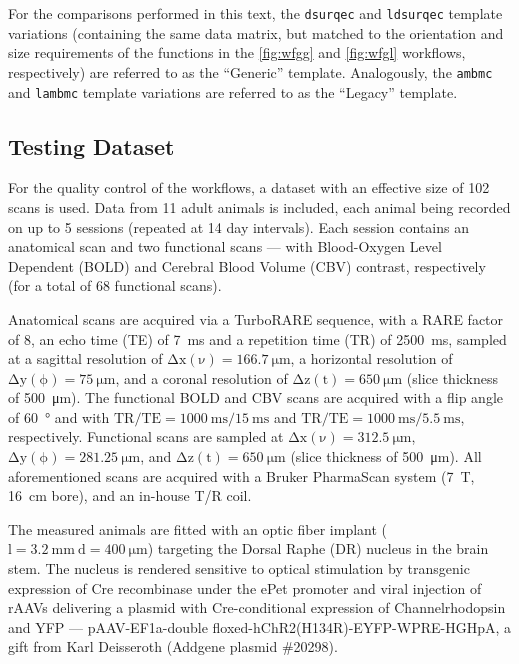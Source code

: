 For the comparisons performed in this text, the \textcolor{mg}{\texttt{dsurqec}} and \textcolor{mg}{\texttt{ldsurqec}} template variations (containing the same data matrix, but matched to the orientation and size requirements of the functions in the \cref{fig:wfgg} and \cref{fig:wfgl} workflows, respectively) are referred to as the “Generic” template.
Analogously, the \textcolor{mg}{\texttt{ambmc}} and \textcolor{mg}{\texttt{lambmc}} template variations are referred to as the “Legacy” template.

\subsection{Testing Dataset}

For the quality control of the workflows, a dataset with an effective size of 102 scans is used.
Data from 11 adult animals is included, each animal being recorded on up to 5 sessions (repeated at 14 day intervals).
Each session contains an anatomical scan and two functional scans --- with Blood-Oxygen Level Dependent (BOLD) \cite{Ogawa1990} and Cerebral Blood Volume (CBV) \cite{Marota1999} contrast, respectively (for a total of 68 functional scans).

Anatomical scans are acquired via a TurboRARE sequence, with a RARE factor of 8, an echo time (TE) of \SI{7}{\milli\second} and a repetition time (TR) of \SI{2500}{\milli\second}, sampled at a sagittal resolution of $\mathrm{\Delta x(\nu)=\SI{166.7}{\micro\meter}}$, a horizontal resolution of $\mathrm{\Delta y(\phi)=\SI{75}{\micro\meter}}$, and a coronal resolution of $\mathrm{\Delta z(t)=\SI{650}{\micro\meter}}$ (slice thickness of \SI{500}{\micro\meter}).
The functional BOLD and CBV scans are acquired with a flip angle of \SI{60}{\degree} and with $\mathrm{TR/TE = \SI{1000}{\milli\second}/\SI{15}{\milli\second}}$ and $\mathrm{TR/TE = \SI{1000}{\milli\second}/\SI{5.5}{\milli\second}}$, respectively.
Functional scans are sampled at $\mathrm{\Delta x(\nu)=\SI{312.5}{\micro\meter}}$, $\mathrm{\Delta y(\phi)=\SI{281.25}{\micro\meter}}$, and $\mathrm{\Delta z(t)=\SI{650}{\micro\meter}}$ (slice thickness of \SI{500}{\micro\meter}).
All aforementioned scans are acquired with a Bruker PharmaScan system (\SI{7}{\tesla}, \SI{16}{\centi\meter} bore), and an in-house T/R coil.

The measured animals are fitted with an optic fiber implant ($\mathrm{l=\SI{3.2}{\milli\meter} \ d=\SI{400}{\micro\meter}}$) targeting the Dorsal Raphe (DR) nucleus in the brain stem.
The nucleus is rendered sensitive to optical stimulation by transgenic expression of Cre recombinase under the ePet promoter \cite{Scott2005} and viral injection of rAAVs delivering a plasmid with Cre-conditional expression of Channelrhodopsin and YFP ---
pAAV-EF1a-double floxed-hChR2(H134R)-EYFP-WPRE-HGHpA, a gift from Karl Deisseroth (Addgene plasmid \#20298).

